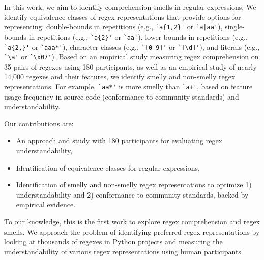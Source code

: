 In this work, we aim to identify  comprehension smells in regular expressions. 
We  identify equivalence classes of regex representations that provide options for representing: double-bounds in repetitions (e.g., \verb!`a{1,2}'! or \verb!`a|aa'!), single-bounds in repetitions (e.g., \verb!`a{2}'! or \verb!`aa'!), lower bounds in repetitions (e.g., \verb!`a{2,}'! or \verb!`aaa*'!), character classes (e.g., \verb!`[0-9]'! or \verb!`[\d]'!), and literals (e.g., \verb!`\a'! or \verb!`\x07'!).
Based on an empirical study measuring regex comprehension on 35 pairs of regexes using 180 participants, as well as an empirical study of nearly 14,000 regexes and their features, we identify smelly and non-smelly regex representations. For example, \verb!`aa*'!  is more smelly than  \verb!`a+'!, based on feature usage frequency in source code (conformance to community standards) and understandability. 

Our contributions are:
\begin{itemize}
\item An approach and study with 180 participants for evaluating regex understandability, 
\item Identification of equivalence classes for regular expressions,
\item {Identification of smelly and non-smelly regex representations to optimize 1) understandability and 2) conformance to community standards, backed by empirical evidence.}
\end{itemize}

To our knowledge, this is the first work to explore regex comprehension and regex smells. We approach the problem of identifying preferred regex representations by looking at thousands of regexes in Python projects and measuring the understandability of various regex representations using human participants.  %

